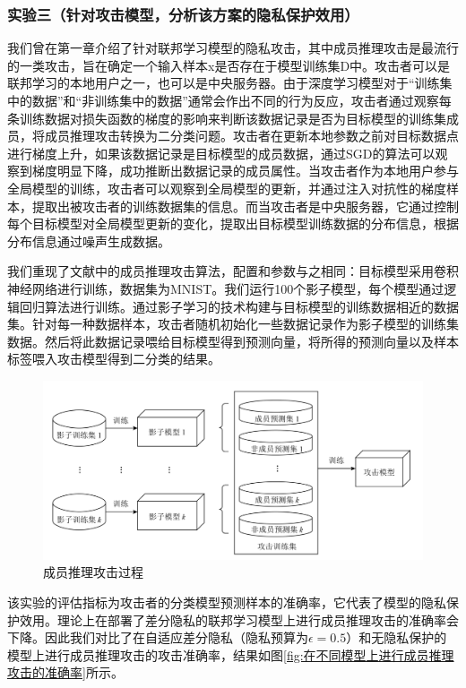 \subsubsection{实验三（针对攻击模型，分析该方案的隐私保护效用）} 
我们曾在第一章介绍了针对联邦学习模型的隐私攻击，其中成员推理攻击是最流行的一类攻击，旨在确定一个输入样本x是否存在于模型训练集D中。攻击者可以是联邦学习的本地用户之一，也可以是中央服务器。由于深度学习模型对于“训练集中的数据”和“非训练集中的数据”通常会作出不同的行为反应，攻击者通过观察每条训练数据对损失函数的梯度的影响来判断该数据记录是否为目标模型的训练集成员，将成员推理攻击转换为二分类问题。攻击者在更新本地参数之前对目标数据点进行梯度上升，如果该数据记录是目标模型的成员数据，通过SGD的算法可以观察到梯度明显下降，成功推断出数据记录的成员属性。当攻击者作为本地用户参与全局模型的训练，攻击者可以观察到全局模型的更新，并通过注入对抗性的梯度样本，提取出被攻击者的训练数据集的信息。而当攻击者是中央服务器，它通过控制每个目标模型对全局模型更新的变化，提取出目标模型训练数据的分布信息，根据分布信息通过噪声生成数据。

我们重现了文献中的成员推理攻击算法，配置和参数与之相同：目标模型采用卷积神经网络进行训练，数据集为MNIST。我们运行100个影子模型，每个模型通过逻辑回归算法进行训练。通过影子学习的技术构建与目标模型的训练数据相近的数据集。针对每一种数据样本，攻击者随机初始化一些数据记录作为影子模型的训练集数据。然后将此数据记录喂给目标模型得到预测向量，将所得的预测向量以及样本标签喂入攻击模型得到二分类的结果。

\begin{figure}[!hbt]
\centering
	\includegraphics[scale=0.55]{fig2/C3/成员推理攻击}%
	\caption{成员推理攻击过程}
	\label{fig:成员推理攻击过程}	
\end{figure}

该实验的评估指标为攻击者的分类模型预测样本的准确率，它代表了模型的隐私保护效用。理论上在部署了差分隐私的联邦学习模型上进行成员推理攻击的准确率会下降。因此我们对比了在自适应差分隐私（隐私预算为$\epsilon=0.5$）和无隐私保护的模型上进行成员推理攻击的攻击准确率，结果如图\ref{fig:在不同模型上进行成员推理攻击的准确率}所示。

